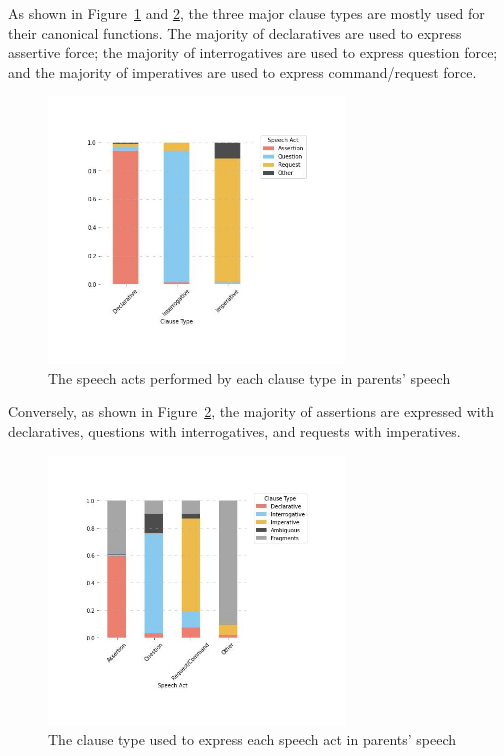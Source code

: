 As shown in Figure~\ref{fig:real-clsp} and \ref{fig:real-spcl}, the three major clause types are mostly used for their canonical functions. The majority of declaratives are used to express assertive force; the majority of interrogatives are used to express question force; and the majority of imperatives are used to express command/request force. 

\begin{figure}[H]
    \centering
    \includegraphics[width=0.7\textwidth]{figures/real-clsp.jpg}
    \caption{The speech acts performed by each clause type in parents' speech}
    \label{fig:real-clsp}
\end{figure}

Conversely, as shown in Figure~\ref{fig:real-spcl}, the majority of assertions are expressed with declaratives, questions with interrogatives, and requests with imperatives.

\begin{figure}[H]
    \centering
    \includegraphics[width=0.7\textwidth]{figures/real-spcl.jpg}
    \caption{The clause type used to express each speech act in parents' speech}
    \label{fig:real-spcl}
\end{figure}


